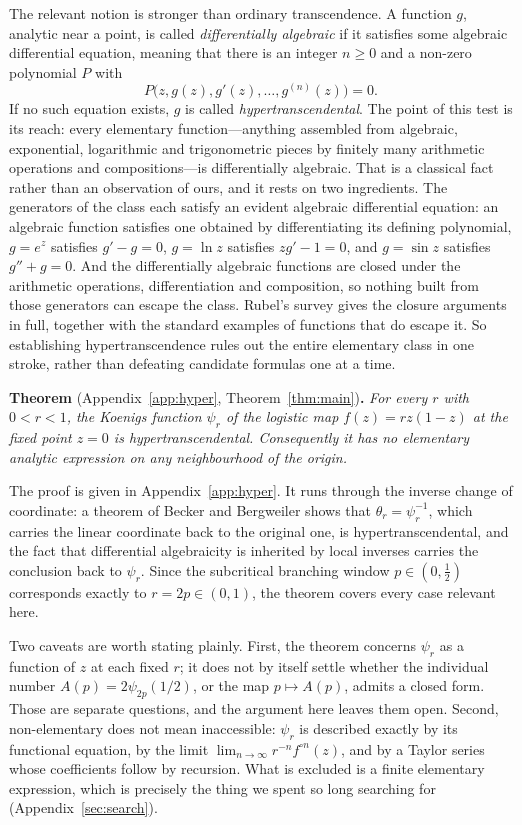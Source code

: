 \documentclass[11pt]{article}
\begin{document}
The relevant notion is stronger than ordinary transcendence. A function $g$, analytic near a point, is called \emph{differentially algebraic} if it satisfies some algebraic differential equation, meaning that there is an integer $n\geq0$ and a non-zero polynomial $P$ with
\[
P\bigl(z,g(z),g'(z),\ldots,g^{(n)}(z)\bigr)=0 .
\]
If no such equation exists, $g$ is called \emph{hypertranscendental}. The point of this test is its reach: every elementary function---anything assembled from algebraic, exponential, logarithmic and trigonometric pieces by finitely many arithmetic operations and compositions---is differentially algebraic. That is a classical fact rather than an observation of ours, and it rests on two ingredients. The generators of the class each satisfy an evident algebraic differential equation: an algebraic function satisfies one obtained by differentiating its defining polynomial, $g=e^z$ satisfies $g'-g=0$, $g=\ln z$ satisfies $zg'-1=0$, and $g=\sin z$ satisfies $g''+g=0$. And the differentially algebraic functions are closed under the arithmetic operations, differentiation and composition, so nothing built from those generators can escape the class. Rubel's survey \cite{Rubel1989} gives the closure arguments in full, together with the standard examples of functions that do escape it. So establishing hypertranscendence rules out the entire elementary class in one stroke, rather than defeating candidate formulas one at a time.


\medskip
\noindent\textbf{Theorem} (Appendix~\ref{app:hyper}, Theorem~\ref{thm:main})\textbf{.}
\emph{For every $r$ with $0<r<1$, the Koenigs function $\psi_r$ of the logistic map $f(z)=rz(1-z)$ at the fixed point $z=0$ is hypertranscendental. Consequently it has no elementary analytic expression on any neighbourhood of the origin.}
\medskip

\noindent
The proof is given in Appendix~\ref{app:hyper}. It runs through the inverse change of coordinate: a theorem of Becker and Bergweiler \cite{BeckerBergweiler1995} shows that $\theta_r=\psi_r^{-1}$, which carries the linear coordinate back to the original one, is hypertranscendental, and the fact that differential algebraicity is inherited by local inverses carries the conclusion back to $\psi_r$. Since the subcritical branching window $p\in(0,\tfrac12)$ corresponds exactly to $r=2p\in(0,1)$, the theorem covers every case relevant here.

Two caveats are worth stating plainly. First, the theorem concerns $\psi_r$ as a function of $z$ at each fixed $r$; it does not by itself settle whether the individual number $A(p)=2\psi_{2p}(1/2)$, or the map $p\mapsto A(p)$, admits a closed form. Those are separate questions, and the argument here leaves them open. Second, non-elementary does not mean inaccessible: $\psi_r$ is described exactly by its functional equation, by the limit $\lim_{n\to\infty}r^{-n}f^{\circ n}(z)$, and by a Taylor series whose coefficients follow by recursion. What is excluded is a finite elementary expression, which is precisely the thing we spent so long searching for (Appendix~\ref{sec:search}).
\end{document}

